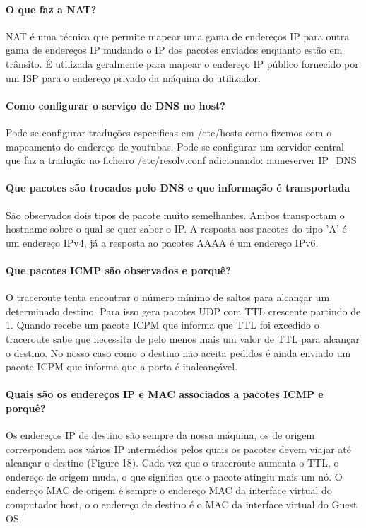 \paragraph{O que faz a NAT?}
NAT é uma técnica que permite mapear uma gama de endereços IP para outra gama de endereços IP mudando o IP dos pacotes enviados enquanto estão em trânsito. É utilizada geralmente para mapear o endereço IP público fornecido por um ISP para o endereço privado da máquina do utilizador.

\paragraph{Como configurar o serviço de DNS no host?}
Pode-se configurar traduções especificas em /etc/hosts como fizemos com o mapeamento do endereço de youtubas. Pode-se configurar um servidor central que faz a tradução no ficheiro /etc/resolv.conf adicionando: nameserver {IP_DNS}

\paragraph{Que pacotes são trocados pelo DNS e que informação é transportada}
São observados dois tipos de pacote muito semelhantes. Ambos transportam o hostname sobre o qual se quer saber o IP. A resposta aos pacotes do tipo 'A' é um endereço IPv4, já a resposta ao pacotes AAAA é um endereço IPv6.

\paragraph{Que pacotes ICMP são observados e porquê?}
O traceroute tenta encontrar o número mínimo de saltos para alcançar um determinado destino. Para isso gera pacotes UDP com TTL crescente partindo de 1. Quando recebe um pacote ICPM que informa que TTL foi excedido o traceroute sabe que necessita de pelo menos mais um valor de TTL para alcançar o destino. No nosso caso como o destino não aceita pedidos é ainda enviado um pacote ICPM que informa que a porta é inalcançável.

\paragraph{Quais são os endereços IP e MAC associados a pacotes ICMP e porquê?}
Os endereços IP de destino são sempre da nossa máquina, os de origem correspondem aos vários IP intermédios pelos quais os pacotes devem viajar até alcançar o destino (Figure 18). Cada vez que o traceroute aumenta o TTL, o endereço de origem muda, o que significa que o pacote atingiu mais um nó. O endereço MAC de origem é sempre o endereço MAC da interface virtual do computador host, o o endereço de destino é o MAC da interface virtual do Guest OS.

